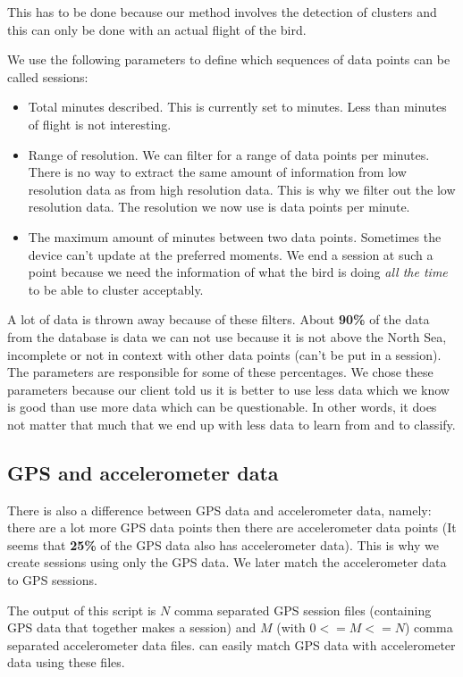 This has to be done because our method involves the detection of clusters and this
can only be done with an actual flight of the bird. 

We use the following parameters to define which sequences of data points can be called sessions: 
\begin{itemize}
    \item Total minutes described. This is currently set to \minimumSessionLengthMinutes minutes. Less than \minimumSessionLengthMinutes minutes of flight is not interesting.
    \item Range of resolution. We can filter for a range of data points per minutes. There is
no way to extract the same amount of information from low resolution data as from high 
resolution data. This is why we filter out the low resolution data. The resolution 
we now use is \resolutionRange data points per minute.
    \item The maximum amount of minutes between two data points. Sometimes the device
can't update at the preferred moments. We end a session at such a point because we need
the information of what the bird is doing \emph{all the time} to be able to cluster 
acceptably. 
\end{itemize}

A lot of data is thrown away because of these filters. About \textbf{90\%} of the data 
from the database is data we can not use because it is not above the North Sea, incomplete
or not in context with other data points (can't be put in a session). The parameters are  
responsible for 
some of these percentages. We chose these parameters because our client told us it is better
to use less data which we know is good than use more data which can be questionable. In 
other words, it does not matter that much that we end up with less data to learn from and
to classify. 

\subsection{GPS and accelerometer data}
\label{subsec:gpsAndAccelerometerData}
There is also a difference between GPS data and accelerometer data, namely: there are a lot
more GPS data points then there are accelerometer data points
(It seems that \textbf{25\%} of the GPS data also has accelerometer data).
This is why we create 
sessions using only
the GPS data. We later match the accelerometer data to GPS sessions. 

The output of this
script is $N$ comma separated GPS session files (containing GPS data that together makes
a session) and $M$ (with $0 <= M <= N$) comma separated accelerometer data files. \matlab
can easily match GPS data with accelerometer data using these files. 

